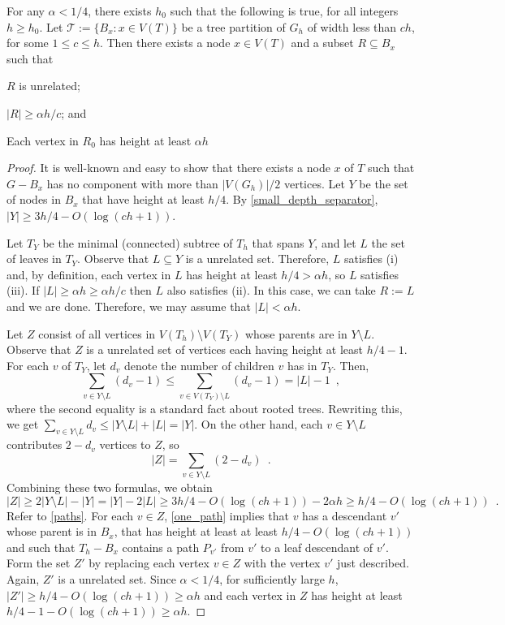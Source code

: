\documentclass{patmorin}
\renewcommand{\le}{\leqslant}
\renewcommand{\ge}{\geqslant}
\begin{document}
\begin{lem}\label{startup}
  For any $\alpha < 1/4$, there exists $h_0$ such that the following is true, for all integers $h\ge  h_0$.  Let $\mathcal{T}:=\{B_x:x\in V(T)\}$ be a tree partition of $G_h$ of width less than $ch$, for some $1\le c\le h$.  Then there exists a node $x\in V(T)$ and a subset $R\subseteq B_x$ such that
  \begin{compactenum}[(i)]
    \item $R$ is unrelated;
    \item $|R|\ge \alpha h/c$; and
    \item Each vertex in $R_0$ has height at least $\alpha h$
  \end{compactenum}
\end{lem}


\begin{proof}
  It is well-known and easy to show that there exists a node $x$ of $T$ such that $G-B_x$ has no component with more than $|V(G_h)|/2$ vertices. Let $Y$ be the set of nodes in $B_x$ that have height at least $h/4$.  By \cref{small_depth_separator}, $|Y|\ge 3h/4 - O(\log (ch+1))$.

  Let $T_Y$ be the minimal (connected) subtree of $T_h$ that spans $Y$, and let $L$ the set of leaves in $T_Y$.  Observe that $L\subseteq Y$ is a unrelated set. Therefore, $L$ satisfies (i) and, by definition, each vertex in $L$ has height at least $h/4 > \alpha h$, so $L$ satisfies (iii).  If $|L|\ge \alpha h \ge \alpha h/c$ then $L$ also satisfies (ii).  In this case, we can take $R:=L$ and we are done.  Therefore, we may assume that $|L|< \alpha h$.
  
  Let $Z$ consist of all vertices in $V(T_h)\setminus V(T_Y)$ whose parents are in $Y\setminus L$.   Observe that $Z$ is a unrelated set of vertices each having height at least $h/4-1$. For each $v$ of $T_Y$, let $d_v$ denote the number of children $v$ has in $T_Y$.  Then,
  \[
     \sum_{v\in Y\setminus L} (d_v-1)
     \le \sum_{v\in V(T_Y)\setminus L} (d_v-1)
     = |L|-1 \enspace ,
  \]
  where the second equality is a standard fact about rooted trees.
  Rewriting this, we get $\sum_{v\in Y\setminus L} {d_v} \le |Y\setminus L| + |L| = |Y|$.  On the other hand, each $v\in Y\setminus L$ contributes $2-d_v$ vertices to $Z$, so
  \[
    |Z| = \sum_{v\in Y\setminus L} (2-d_v) \enspace .
  \]
  Combining these two formulas, we obtain
  \[
    |Z| \ge 2|Y\setminus L| - |Y| = |Y| - 2|L| 
    \ge 3h/4-O(\log(ch+1)) - 2\alpha h 
    \ge h/4-O(\log(ch+1)) \enspace .
  \]
  Refer to \cref{paths}.  For each $v\in Z$, \cref{one_path} implies that $v$ has a descendant $v'$ whose parent is in $B_x$, that has height at least at least $h/4-O(\log(ch+1))$ and such that $T_h-B_x$ contains a path $P_{v'}$ from $v'$ to a leaf descendant of $v'$.  Form the set $Z'$ by replacing each vertex $v\in Z$ with the vertex $v'$ just described.  Again, $Z'$ is a unrelated set.  Since $\alpha < 1/4$, for sufficiently large $h$, $|Z'|\ge h/4 - O(\log(ch+1)) \ge \alpha h$ and each vertex in $Z$ has height at least $h/4 - 1 - O(\log(ch+1)) \ge \alpha h$.


\end{proof}
\end{document}
